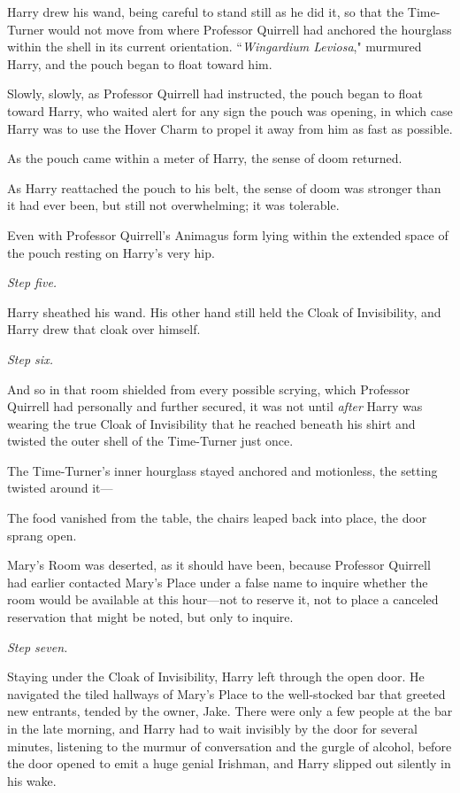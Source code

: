 Harry drew his wand, being careful to stand still as he did it, so that the Time-Turner would not move from where Professor Quirrell had anchored the hourglass within the shell in its current orientation. ``\emph{Wingardium Leviosa}," murmured Harry, and the pouch began to float toward him.

Slowly, slowly, as Professor Quirrell had instructed, the pouch began to float toward Harry, who waited alert for any sign the pouch was opening, in which case Harry was to use the Hover Charm to propel it away from him as fast as possible.

As the pouch came within a meter of Harry, the sense of doom returned.

As Harry reattached the pouch to his belt, the sense of doom was stronger than it had ever been, but still not overwhelming; it was tolerable.

Even with Professor Quirrell's Animagus form lying within the extended space of the pouch resting on Harry's very hip.

\emph{Step five.}

Harry sheathed his wand. His other hand still held the Cloak of Invisibility, and Harry drew that cloak over himself.

\emph{Step six.}

And so in that room shielded from every possible scrying, which Professor Quirrell had personally and further secured, it was not until \emph{after} Harry was wearing the true Cloak of Invisibility that he reached beneath his shirt and twisted the outer shell of the Time-Turner just once.

The Time-Turner's inner hourglass stayed anchored and motionless, the setting twisted around it—

The food vanished from the table, the chairs leaped back into place, the door sprang open.

Mary's Room was deserted, as it should have been, because Professor Quirrell had earlier contacted Mary's Place under a false name to inquire whether the room would be available at this hour—not to reserve it, not to place a canceled reservation that might be noted, but only to inquire.

\emph{Step seven.}

Staying under the Cloak of Invisibility, Harry left through the open door. He navigated the tiled hallways of Mary's Place to the well-stocked bar that greeted new entrants, tended by the owner, Jake. There were only a few people at the bar in the late morning, and Harry had to wait invisibly by the door for several minutes, listening to the murmur of conversation and the gurgle of alcohol, before the door opened to emit a huge genial Irishman, and Harry slipped out silently in his wake.

